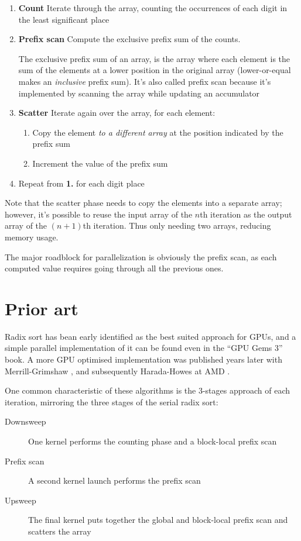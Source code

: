 \documentclass[a4paper]{report}
\begin{document}
\begin{enumerate}[label=\textbf{\arabic*.}, leftmargin=*]
  \item\textbf{Count} Iterate through the array, counting the occurrences of each digit in the least significant place
  \item\textbf{Prefix scan} Compute the exclusive prefix sum of the counts.
  
    The exclusive prefix sum of an array, is the array where each element is the sum of the elements at a lower position in the original array (lower-or-equal makes an \emph{inclusive} prefix sum). It's also called prefix scan because it's implemented by scanning the array while updating an accumulator
  \item\textbf{Scatter} Iterate again over the array, for each element:
  
  \begin{enumerate}
    \item Copy the element \emph{to a different array} at the position indicated by the prefix sum
    \item Increment the value of the prefix sum
  \end{enumerate}
  \item Repeat from \textbf{1.} for each digit place
\end{enumerate}

Note that the scatter phase needs to copy the elements into a separate array; however, it's possible to reuse the input array of the $n$th iteration as the output array of the $(n+1)$th iteration. Thus only needing two arrays, reducing memory usage.

The major roadblock for parallelization is obviously the prefix scan, as each computed value requires going through all the previous ones.

\section{Prior art}

Radix sort has bean early identified as the best suited approach for GPUs, and a simple parallel implementation of it can be found even in the ``GPU Gems 3'' \cite{nguyen2007gpu} book. A more GPU optimised implementation was published years later with Merrill-Grimshaw \cite{10.1145/1854273.1854344}, and subsequently Harada-Howes at AMD \cite{harada2011introduction}.

One common characteristic of these algorithms is the 3-stages approach of each iteration, mirroring the three stages of the serial radix sort:
\begin{description}
  \item[Downsweep] One kernel performs the counting phase and a block-local prefix scan
  \item[Prefix scan] A second kernel launch performs the prefix scan
  \item[Upsweep] The final kernel puts together the global and block-local prefix scan and scatters the array
\end{description}
\end{document}
